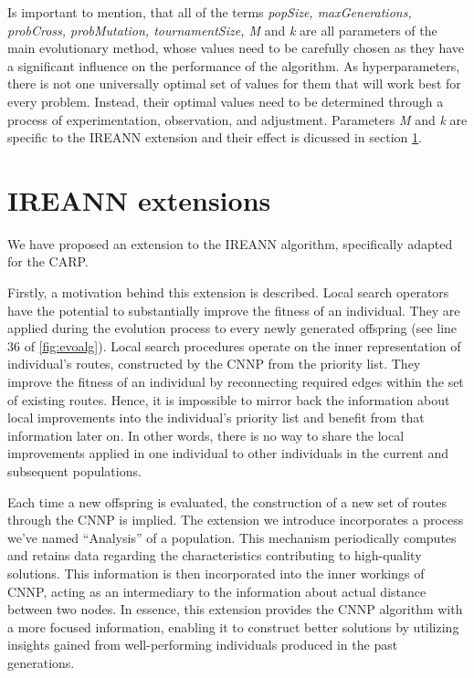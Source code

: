 \documentclass[twoside]{ctuthesis}
\theoremstyle{plain}
\theoremstyle{definition}
\theoremstyle{note}
\begin{document}
Is important to mention, that all of the terms \emph{popSize, maxGenerations, probCross, probMutation, tournamentSize, M} and \emph{k} are all parameters of the main evolutionary method, whose values need to be carefully chosen as they have a significant influence on the performance of the algorithm. As hyperparameters, there is not one universally optimal set of values for them that will work best for every problem. Instead, their optimal values need to be determined through a process of experimentation, observation, and adjustment. Parameters \emph{M} and \emph{k} are specific to the IREANN extension and their effect is dicussed in section \ref{sec:extension}.


\section{IREANN extensions}
\label{sec:extension}
We have proposed an extension to the IREANN algorithm, specifically adapted for the CARP. 

Firstly, a motivation behind this extension is described. Local search operators have the potential to substantially improve the fitness of an individual. They are applied during the evolution process to every newly generated offspring (see line 36 of \ref{fig:evoalg}). Local search procedures operate on the inner representation of individual's routes, constructed by the CNNP from the priority list. They improve the fitness of an individual by reconnecting required edges within the set of existing routes.
Hence, it is impossible to mirror back the information about local improvements into the individual's priority list and benefit from that information later on. In other words,  there is no way to share the local improvements applied in one individual to other individuals in the current and subsequent populations.

Each time a new offspring is evaluated, the construction of a new set of routes through the CNNP is implied. 
The extension we introduce incorporates a process we've named ``Analysis'' of a population. This mechanism periodically computes and retains data regarding the characteristics contributing to high-quality solutions. This information is then incorporated into the inner workings of CNNP, acting as an intermediary to the information about actual distance between two nodes. In essence, this extension provides the CNNP algorithm with a more focused information, enabling it to construct better solutions by utilizing insights gained from well-performing individuals produced in the past generations.
	
\end{document}

